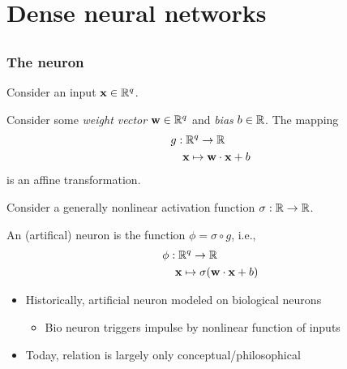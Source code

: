 \section{Dense neural networks}

\subsection{}

\begin{frame}
    \frametitle{The neuron}

    Consider an input $\mathbf{x} \in \mathbb{R}^q$.
    \begin{block}{}
        Consider some \emph{weight vector} $\mathbf{w} \in \mathbb{R}^q$ and \emph{bias} $b \in \mathbb{R}$.
        The mapping
        \begin{align*}
            g &: \mathbb{R}^q \to \mathbb{R} \\
            &\hspace{1.25ex} \mathbf{x} \mapsto \mathbf{w} \cdot \mathbf{x} + b
        \end{align*}
        is an \alert{affine transformation}.
    \end{block}
    \pause

    Consider a generally nonlinear \alert{activation function} $\sigma: \mathbb{R} \to \mathbb{R}$.

    \begin{block}{}
        An (artifical) \alert{neuron} is the function $\phi = \sigma \circ g$, i.e.,
        \begin{align*}
            \phi &: \mathbb{R}^q \to \mathbb{R} \\
            &\hspace{1.25ex} \mathbf{x} \mapsto \sigma(\mathbf{w} \cdot \mathbf{x} + b)
        \end{align*}
    \end{block}
    \pause

    \begin{itemize}
        \item Historically, artificial neuron modeled on biological neurons
        \begin{itemize}
            \item Bio neuron triggers impulse by nonlinear function of inputs
        \end{itemize}
        \item Today, relation is largely only conceptual/philosophical
    \end{itemize}
\end{frame}

